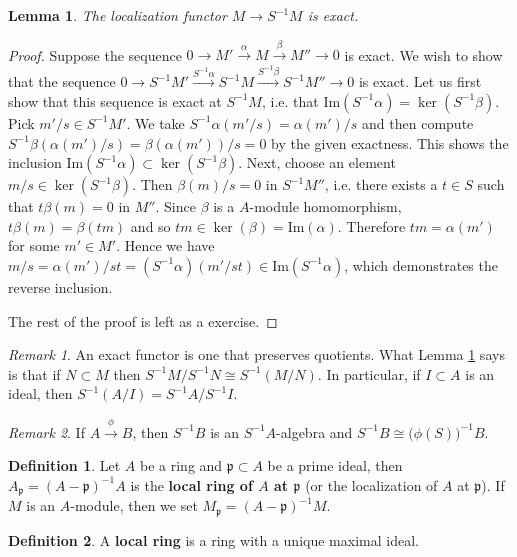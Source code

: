 \documentclass{article}
\newcommand{\fr}{\mathfrak}
\theoremstyle{plain}
\newtheorem{lem}[thm]{Lemma}
\theoremstyle{definition}
\newtheorem{defn}{Definition}
\theoremstyle{remark}
\newtheorem*{rem}{Remark}
\begin{document}
\begin{lem}
\label{L8}
    The localization functor $M\to S^{-1}M$ is exact.
\end{lem}
\begin{proof}
    Suppose the sequence $0\to M'\overset{\alpha}{\to} M\overset{\beta}{\to} M''\to 0$ is exact. We wish to show that the sequence $0\to S^{-1}M'\overset{S^{-1}\alpha}{\to} S^{-1}M\overset{S^{-1}\beta}{\to} S^{-1}M''\to 0$ is exact. Let us first show that this sequence is exact at $S^{-1}M$, i.e. that $\text{Im} (S^{-1}\alpha)=\ker(S^{-1}\beta)$. Pick $m'/s\in S^{-1}M'$. We take $S^{-1}\alpha(m'/s)=\alpha(m')/s$ and then compute $S^{-1}\beta(\alpha(m')/s)=\beta(\alpha(m'))/s=0$ by the given exactness. This shows the inclusion $\text{Im} (S^{-1}\alpha)\subset\ker(S^{-1}\beta)$. Next, choose an element $m/s\in \ker(S^{-1}\beta).$ Then $\beta(m)/s=0$ in $S^{-1}M''$, i.e. there exists a $t\in S$ such that $t\beta(m)=0$ in $M''$. Since $\beta$ is a $A$-module homomorphism, $t\beta(m)=\beta(tm)$ and so $tm\in\ker(\beta)=\text{Im}(\alpha)$. Therefore $tm=\alpha(m')$ for some $m'\in M'$. Hence we have $m/s=\alpha(m')/st=(S^{-1}\alpha)(m'/st)\in\text{Im}(S^{-1}\alpha)$, which demonstrates the reverse inclusion.
    
    The rest of the proof is left as a exercise.
\end{proof}

\begin{rem}
An exact functor is one that preserves quotients. What Lemma \ref{L8} says is that if $N\subset M$ then $S^{-1}M/S^{-1}N \cong S^{-1}(M/N)$. In particular, if $I\subset A$ is an ideal, then $S^{-1}(A/I) = S^{-1}A/S^{-1}I$.
\end{rem}

\begin{rem}
If $A \overset{\phi}{\to} B$, then $S^{-1}B$ is an $S^{-1}A$-algebra and $S^{-1}B \cong \big(\phi(S)\big)^{-1} B$.
\end{rem}

\begin{defn}
Let $A$ be a ring and $\fr p\subset A$ be a prime ideal, then $A_{\fr p} = (A-\fr p)^{-1}A$ is the \textbf{local ring of $A$ at $\fr p$} (or the localization of $A$ at $\fr p$). If $M$ is an $A$-module, then we set $M_{\fr p} = (A-\fr{p})^{-1}M$.
\end{defn}

\begin{defn}
A \textbf{local ring} is a ring with a unique maximal ideal.
\end{defn}
\end{document}

